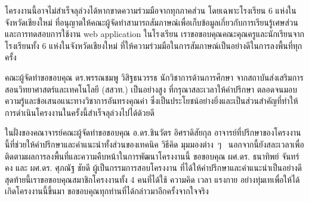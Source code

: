 %

\begin{acknowledgments} โครงงานนี้อาจไม่สำเร็จลุล่วงได้หากขาดความร่วมมือจากทุกภาคส่วน โดยเฉพาะโรงเรียน 6 
แห่งในจังหวัดเชียงใหม่ ที่อนุญาตให้คณะผู้จัดทำสามารถสัมภาษณ์เพื่อเก็บข้อมูลเกี่ยวกับการเรียนรู้เศษส่วนและการทดสอบการใช้งาน web application ในโรงเรียน
เราขอขอบคุณคณะคุณครูและนักเรียนจากโรงเรียนทั้ง 6 แห่งในจังหวัดเชียงใหม่ ที่ให้ความร่วมมือในการสัมภาษณ์เป็นอย่างดีในการลงพื้นที่ทุกครั้ง

คณะผู้จัดทำขอขอบคุณ ดร.พรรณชมพู วิสิฐธนวรรธ นักวิชาการด้านการศึกษา จากสถาบันส่งเสริมการสอนวิทยาศาสตร์และเทคโนโลยี (สสวท.) 
เป็นอย่างสูง ที่กรุณาสละเวลาให้คำปรึกษา ตลอดจนมอบความรู้และข้อเสนอแนะทางวิชาการอันทรงคุณค่า ซึ่งเป็นประโยชน์อย่างยิ่งและเป็นส่วนสำคัญที่ทำให้การดำเนินโครงงานในครั้งนี้สำเร็จลุล่วงไปได้ด้วยดี

ในฝั่งของคณาจารย์คณะผู้จัดทำขอขอบคุณ อ.ดร.ชินวัตร อิศราดิสัยกุล อาจารย์ที่ปรึกษาของโครงงานนี้ที่ช่วยให้คําปรึกษาและคําแนะนําทั้งส่วนของเทคนิค วิธีคิด มุมมองต่าง~ๆ~ 
นอกจากนี้ยังสละเวลาเพื่อติดตามผลการลงพื้นที่และความคืบหน้าในการพัฒนาโครงงานนี้ 
ขอขอบคุณ ผศ.ดร. ธนาทิพย์ จันทร์คง และ ผศ.ดร. ศุภณัฐ ชัยดี  ผู้เป็นกรรมการสอบโครงงาน ที่ได้ให้คําปรึกษาและคําแนะนําเป็นอย่างดี
สุดท้ายนี้เราขอขอบคุณสมาชิกโครงงานทั้ง 4 คนที่ได้ใช้ ความคิด เวลา แรงกาย อย่างทุ่มเทเพื่อให้ได้เกิดโครงงานนี้ขึ้นมา ขอขอบคุณทุกท่านที่ได้กล่าวมาอีกครั้งจากใจจริง

\end{acknowledgments}%
\fi %

\contentspage

\ifproject
\figurelistpage

\tablelistpage
\fi %



